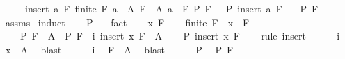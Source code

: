 \begin{isabellebody}
\ \ \ \ \ insert{\isacharcolon}{\kern0pt}\ {\isachardoublequoteopen}{\isasymAnd}a\ F{\isachardot}{\kern0pt}\ {\isasymlbrakk}finite\ F{\isacharsemicolon}{\kern0pt}\ a\ {\isasymin}\ A{\isacharsemicolon}{\kern0pt}\ F\ {\isasymsubseteq}\ A{\isacharsemicolon}{\kern0pt}\ a\ {\isasymnotin}\ F{\isacharsemicolon}{\kern0pt}\ P\ F\ {\isasymrbrakk}\ {\isasymLongrightarrow}\ P\ {\isacharparenleft}{\kern0pt}insert\ a\ F{\isacharparenright}{\kern0pt}{\isachardoublequoteclose}\isanewline
\ \ \ {\isachardoublequoteopen}P\ F{\isachardoublequoteclose}\isanewline
%
\isadelimproof
\ \ %
\endisadelimproof
%
\isatagproof
{}\isamarkupfalse%
\ assms{\isacharparenleft}{\kern0pt}{}{\isacharcomma}{\kern0pt}{}{\isacharparenright}{\kern0pt}\isanewline
{}\isamarkupfalse%
\ induct\isanewline
\ \ \isamarkupfalse%
\ {\isachardoublequoteopen}P\ {\isacharbraceleft}{\kern0pt}{\isacharbraceright}{\kern0pt}{\isachardoublequoteclose}\ \isamarkupfalse%
\ fact\isanewline
{}\isamarkupfalse%
\isanewline
\ \ \isamarkupfalse%
\ x\ F\isanewline
\ \ \isamarkupfalse%
\ {\isachardoublequoteopen}finite\ F{\isachardoublequoteclose}\ \ {\isachardoublequoteopen}x\ {\isasymnotin}\ F{\isachardoublequoteclose}\ \isanewline
\ \ \ \ P{\isacharcolon}{\kern0pt}\ {\isachardoublequoteopen}F\ {\isasymsubseteq}\ A\ {\isasymLongrightarrow}\ P\ F{\isachardoublequoteclose}\ \ i{\isacharcolon}{\kern0pt}\ {\isachardoublequoteopen}insert\ x\ F\ {\isasymsubseteq}\ A{\isachardoublequoteclose}\isanewline
\ \ \isamarkupfalse%
\ {\isachardoublequoteopen}P\ {\isacharparenleft}{\kern0pt}insert\ x\ F{\isacharparenright}{\kern0pt}{\isachardoublequoteclose}\isanewline
\ \ \isamarkupfalse%
\ {\isacharparenleft}{\kern0pt}rule\ insert{\isacharparenright}{\kern0pt}\isanewline
\ \ \ \ \isamarkupfalse%
\ i\ \isamarkupfalse%
\ {\isachardoublequoteopen}x\ {\isasymin}\ A{\isachardoublequoteclose}\ \isamarkupfalse%
\ blast\isanewline
\ \ \ \ \isamarkupfalse%
\ i\ \isamarkupfalse%
\ {\isachardoublequoteopen}F\ {\isasymsubseteq}\ A{\isachardoublequoteclose}\ \isamarkupfalse%
\ blast\isanewline
\ \ \ \ \isamarkupfalse%
\ P\ \isamarkupfalse%
\ {\isachardoublequoteopen}P\ F{\isachardoublequoteclose}\ \isacommand{{\isachardot}{\kern0pt}}\isamarkupfalse%
\isanewline
\ \ \ \ \isamarkupfalse%

\end{isabellebody}

